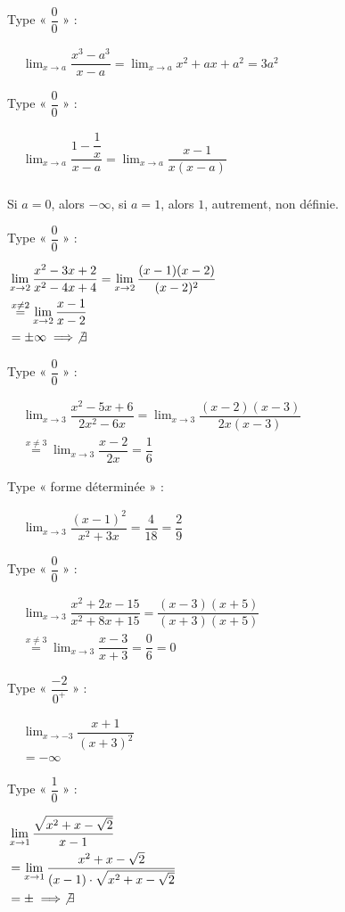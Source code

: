 {\begin{tasks}
\task Type « $\dfrac{0}{0}$ » :

\( \begin{aligned}
&\lim_{x \to a} \dfrac{x^3 - a^3}{x - a} = \lim_{x \to a} x^2 + ax + a^2 = 3a^2
\end{aligned} \)

\task Type « $\dfrac{0}{0}$ » :

\( \begin{aligned}
&\lim_{x \to a} \dfrac{1 - \dfrac{1}{x}}{x - a} = \lim_{x \to a} \dfrac{x - 1}{x(x - a)} \\
\end{aligned} \)

Si $a=0$, alors $-\infty$, si $a=1$, alors $1$, autrement, non définie. 

\task Type « $\dfrac{0}{0}$ » :

\( \begin{aligned}
&\lim_{x \to 2} \dfrac{x^2 - 3x + 2}{x^2 - 4x + 4} = \lim_{x \to 2} \dfrac{(x - 1)(x - 2)}{(x - 2)^2} \\
&\stackrel{x \ne 2}{=} \lim_{x \to 2} \dfrac{x - 1}{x - 2}\\
&= \pm \infty \implies \not \exists
\end{aligned} \)

\task Type « $\dfrac{0}{0}$ » :

\( \begin{aligned}
&\lim_{x \to 3} \dfrac{x^2 - 5x + 6}{2x^2 - 6x} = \lim_{x \to 3} \dfrac{(x - 2)(x - 3)}{2x(x - 3)} \\
&\stackrel{x \ne 3}{=} \lim_{x \to 3} \dfrac{x - 2}{2x} = \dfrac{1}{6}
\end{aligned} \)

\task Type « forme déterminée » :

\( \begin{aligned}
&\lim_{x \to 3} \dfrac{(x - 1)^2}{x^2 + 3x} = \dfrac{4}{18} = \dfrac{2}{9}
\end{aligned} \)

\task Type « $\dfrac{0}{0}$ » :

\( \begin{aligned}
&\lim_{x \to 3} \dfrac{x^2 + 2x - 15}{x^2 + 8x + 15} = \dfrac{(x - 3)(x + 5)}{(x + 3)(x + 5)} \\
&\stackrel{x \ne 3}{=} \lim_{x \to 3} \dfrac{x - 3}{x + 3} = \dfrac{0}{6} = 0
\end{aligned} \)

\task Type « $\dfrac{-2}{0^+}$ » :

\( \begin{aligned}
&\lim_{x \to -3} \dfrac{x + 1}{(x + 3)^2}\\
& = -\infty
\end{aligned} \)

\task Type « $\dfrac{1}{0}$ » :

\( \begin{aligned}
&\lim_{x \to 1} \dfrac{\sqrt{x^2 + x - \sqrt{2}}}{x - 1}\\
&=\lim_{x\to 1}\dfrac{x^2+x-\sqrt{2}}{(x-1)\cdot \sqrt{x^2+x-\sqrt{2}}}\\
&=\pm\implies \not \exists
\end{aligned} \)
\end{tasks}
}

